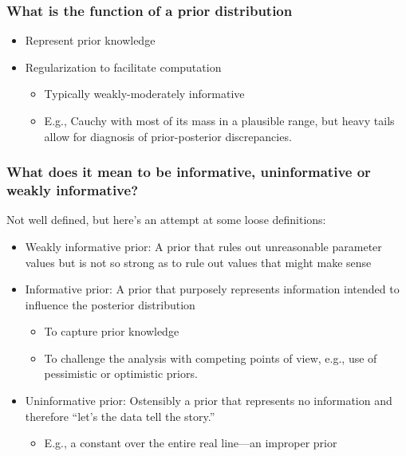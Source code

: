 \documentclass[handout]{beamer}
\begin{document}
\begin{frame}
  \frametitle{What is the function of a prior distribution}

  \begin{itemize}
  \item<1-> Represent prior knowledge
\item<2-> Regularization to facilitate computation
  \begin{itemize}
 \item Typically weakly-moderately informative
\item E.g., Cauchy with most of its mass in a plausible range, but heavy tails allow for diagnosis of prior-posterior discrepancies.
  \end{itemize}
  \end{itemize}

\end{frame}

\begin{frame}
  \frametitle{What does it mean to be informative, uninformative or
    weakly informative?}
  
Not well defined, but here's an attempt at some loose definitions:
  \begin{itemize}
  \item<1-> Weakly informative prior: A prior that rules out unreasonable
    parameter values but is not so strong as to rule out values that
    might make sense
\item<2-> Informative prior: A prior that purposely represents
  information intended to influence the  posterior distribution
  \begin{itemize}
  \item To capture prior knowledge
\item To challenge the analysis with competing points of view, e.g.,
  use of pessimistic or optimistic priors.
  \end{itemize}
\item<3-> Uninformative prior: Ostensibly a prior that represents no
  information and therefore ``let's the data tell the story.''
  \begin{itemize}
  \item E.g., a constant over the entire real line---an improper prior
  \end{itemize}
  \end{itemize}

\end{frame}
\end{document}
